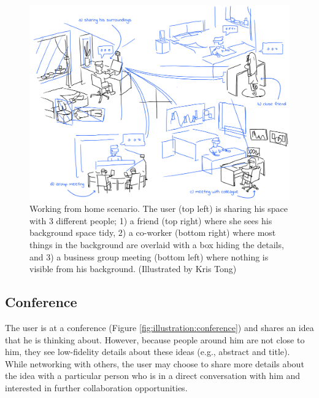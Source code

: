 \begin{figure}[ht]
    \centering
    \includegraphics[width=\linewidth]{images/30-continuum/illustrations/2_Group_Meeting.png}
    \caption{Working from home scenario. The user (top left) is sharing his space with 3 different people; 1) a friend (top right) where she sees his background space tidy, 2) a co-worker (bottom right) where most things in the background are overlaid with a box hiding the details, and 3) a business group meeting (bottom left) where nothing is visible from his background.
    (Illustrated by Kris Tong)}
    \label{fig:illustration:group-meeting}
\end{figure}

\subsection{Conference}

The user is at a conference (Figure \ref{fig:illustration:conference}) and shares an idea that he is thinking about. However, because people around him are not close to him, they see low-fidelity details about these ideas (e.g., abstract and title). While networking with others, the user may choose to share more details about the idea with a particular person who is in a direct conversation with him and interested in further collaboration opportunities.

